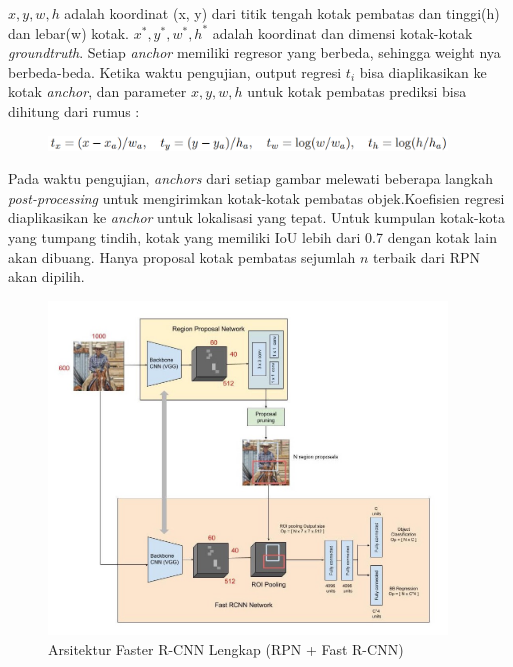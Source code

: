 \documentclass{article}
\begin{document}
   	$x, y, w, h$ adalah koordinat (x, y) dari titik tengah kotak pembatas dan tinggi(h) dan lebar(w) kotak. $x^{*}, y^{*}, w^{*}, h^{*}$ adalah koordinat dan dimensi kotak-kotak \textit{groundtruth}. Setiap\textit{ anchor} memiliki regresor yang berbeda, sehingga weight nya berbeda-beda. Ketika waktu pengujian, output regresi $t_{i}$ bisa diaplikasikan ke kotak\textit{ anchor}, dan parameter $x, y, w, h$ untuk kotak pembatas prediksi bisa dihitung dari rumus :
   	
   	\begin{figure}[H]
   		\centering
   		\includegraphics[width=400px]{rumus/regression_target_2.png}
   	\end{figure}
   	
   	\par Pada waktu pengujian, \textit{anchors} dari setiap gambar melewati beberapa langkah \textit{post-processing} untuk mengirimkan kotak-kotak pembatas objek.Koefisien regresi diaplikasikan ke \textit{anchor} untuk lokalisasi yang tepat. Untuk kumpulan kotak-kota yang tumpang tindih, kotak yang memiliki IoU lebih dari 0.7 dengan kotak lain akan dibuang. Hanya proposal kotak pembatas sejumlah $n$ terbaik dari RPN akan dipilih.
   	
   	\begin{figure}[H]
   		\centering
   		\includegraphics[width=400px]{arsitektur/full_architecture.jpeg}
   		\caption{Arsitektur Faster R-CNN Lengkap (RPN + Fast R-CNN)}
   	\end{figure}
   	
\end{document}
